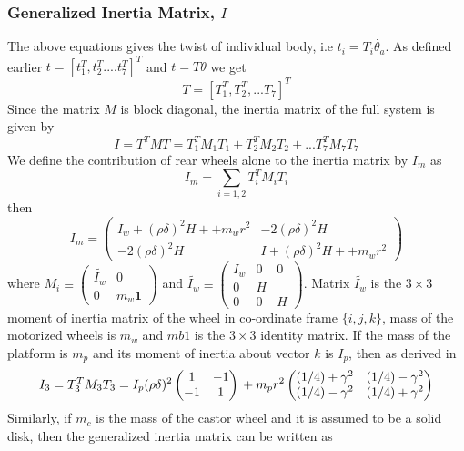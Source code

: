 \subsubsection{Generalized Inertia Matrix, $I$}
 The above equations gives the twist of individual body, i.e $t_i=T_i\dot{\theta_a}$. As defined earlier  $t=[t_1^T, t_2^T....t_7^T]^T$ and $t=T\theta$ we get  \[T=[T_1^T, T_2^T,... T_7]^T\] Since the matrix $M$ is block diagonal, the inertia matrix of the full system is given by
\begin{equation}
I=T^TMT=T_1^TM_1T_1+T_2^TM_2T_2+...T_7^TM_7T_7
\end{equation}
We define the contribution of rear wheels alone to the inertia matrix by $I_m$ as  \[ I_m=\sum_{i=1,2}T_i^TM_iT_i\] then
\begin{equation}
I_m=\begin{pmatrix}
I_w+(\rho\delta)^2H++m_wr^2 & -2(\rho\delta)^2H
\\
-2(\rho\delta)^2H &I+(\rho\delta)^2H++m_wr^2
\end{pmatrix} 
\end{equation}
where $ M_i \equiv\begin{pmatrix}
\tilde{I_w} &0\\0 & m_w\mathbf{1}
\end{pmatrix} $ and $\tilde{I_w}\equiv\begin{pmatrix}
I_w&0&0\\0&H&\\0&0&H
\end{pmatrix}$. Matrix $\tilde{I_w}$ is the $3\times 3$ moment of inertia matrix of the wheel in co-ordinate frame $\{i,j,k\}$, mass of the motorized wheels is  $m_w$ and $mb{1}$ is the $3\times 3$ identity matrix.
If the mass of the platform is $m_p$ and its moment of inertia about vector ${k}$ is $I_p$, then as derived in \cite{angeles2013fundamentals} 
\begin{equation}
I_3=T^T_3M_3T_3 =I_p(\rho\delta)^2\begin{pmatrix}
1&-1\\-1&1 \end{pmatrix}\\
+m_pr^2\begin{pmatrix}
(1/4)+\gamma^2 & (1/4)-\gamma^2\\(1/4)-\gamma^2 & (1/4)+\gamma^2
\end{pmatrix}
\end{equation}
Similarly, if $m_c$ is the mass of the castor wheel and it is assumed to be a solid disk, then the generalized inertia matrix  can be written as
